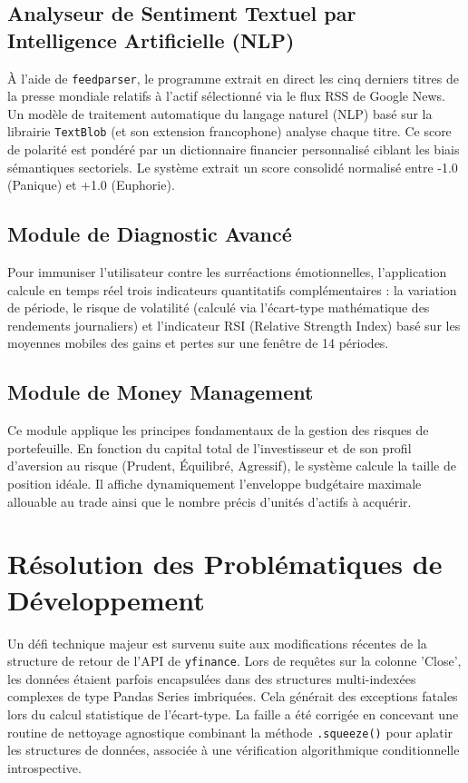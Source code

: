 \documentclass[11pt,a4paper]{article}
\begin{document}
\subsection{Analyseur de Sentiment Textuel par Intelligence Artificielle (NLP)}
À l'aide de \texttt{feedparser}, le programme extrait en direct les cinq derniers titres de la presse mondiale relatifs à l'actif sélectionné via le flux RSS de Google News. Un modèle de traitement automatique du langage naturel (NLP) basé sur la librairie \texttt{TextBlob} (et son extension francophone) analyse chaque titre. Ce score de polarité est pondéré par un dictionnaire financier personnalisé ciblant les biais sémantiques sectoriels. Le système extrait un score consolidé normalisé entre -1.0 (Panique) et +1.0 (Euphorie).

\subsection{Module de Diagnostic Avancé}
Pour immuniser l'utilisateur contre les surréactions émotionnelles, l'application calcule en temps réel trois indicateurs quantitatifs complémentaires : la variation de période, le risque de volatilité (calculé via l'écart-type mathématique des rendements journaliers) et l'indicateur RSI (Relative Strength Index) basé sur les moyennes mobiles des gains et pertes sur une fenêtre de 14 périodes.

\subsection{Module de Money Management}
Ce module applique les principes fondamentaux de la gestion des risques de portefeuille. En fonction du capital total de l'investisseur et de son profil d'aversion au risque (Prudent, Équilibré, Agressif), le système calcule la taille de position idéale. Il affiche dynamiquement l'enveloppe budgétaire maximale allouable au trade ainsi que le nombre précis d'unités d'actifs à acquérir.

\section{Résolution des Problématiques de Développement}
Un défi technique majeur est survenu suite aux modifications récentes de la structure de retour de l'API de \texttt{yfinance}. Lors de requêtes sur la colonne 'Close', les données étaient parfois encapsulées dans des structures multi-indexées complexes de type Pandas Series imbriquées. Cela générait des exceptions fatales lors du calcul statistique de l'écart-type. La faille a été corrigée en concevant une routine de nettoyage agnostique combinant la méthode \texttt{.squeeze()} pour aplatir les structures de données, associée à une vérification algorithmique conditionnelle introspective.
\end{document}

